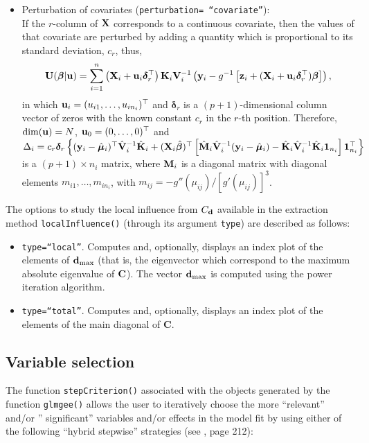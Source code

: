 \begin{itemize}
     \item Perturbation of covariates ({\tt perturbation= ``covariate''}):\\
     If the $r$-column of ${\bf X}$ corresponds to a continuous covariate, then the values of that covariate are perturbed by adding a quantity which is proportional to its standard deviation, $c_r$, thus, 
     \begin{equation*}
         {\bf U}(\bm{\beta}|{\bf u})=\sum\limits_{i=1}^{n} \left({\bf X}_i +{\bf u}_i {\bm{\delta}}_r^{\top}\right) {\bf K}_i {\bf V}_i^{-1} \left( {\bf y}_i - g^{-1} \left[{\bf z}_i + ({\bf X}_i + {\bf u}_i {\bm{\delta}}_r^{\top}) {\bm{\beta}}\right]\right),
     \end{equation*}
     in which ${\bf u}_i= (u_{i1},\ldots,u_{in_i})^{\top}$ and $\bm{\delta}_r$ is a $(p+1)$-dimensional column vector of zeros with the known constant $c_r$ in the $r$-th position. Therefore, ${\dim}({\bf u})=N$, ${\bf u}_0=(0,\ldots,0)^{\top}$ and $\Delta_i=c_r {\bm{\delta}}_r \left\{
     ({\bf y}_i - \hat{\bm{\mu}}_i)^{\top} \hat{\bf V}_i^{-1}\hat{\bf K}_i + ({\bf X}_i \hat{\bm{\beta}})^{\top} \left[ \hat{\bf M}_i\hat{\bf V}_i^{-1} ({\bf y}_i - \hat{\bm{\mu}}_i) - \hat{\bf K}_i \hat{\bf V}_i^{-1} \hat{\bf K}_i \bm{1}_{n_i}\right] {\bm 1}_{n_i}^{\top}\right\}$
     is a $(p+1)\times n_i$ matrix, where ${\bf M}_i$ is a diagonal matrix with diagonal elements $m_{i1},\ldots,m_{in_i}$, with $m_{ij}=-g''(\mu_{ij})/[g'(\mu_{ij})]^{3}$.
\end{itemize}
The options to study the local influence from $C_{\bf d}$ available in the extraction method {\tt localInfluence()} (through its argument {\tt type}) are described as follows:
\begin{itemize}
    \item {\tt type=``local''}. Computes and, optionally, displays an index plot of the elements of ${\bf d}_{\rm max}$ (that is, the eigenvector which correspond to the maximum absolute eigenvalue of ${\bf C}$). The vector ${\bf d}_{\rm max}$ is computed using the power iteration algorithm. 
    \item {\tt type=``total''}. Computes and, optionally, displays an index plot of the elements of the main diagonal of {\bf C}.
\end{itemize}

\subsection{Variable selection}
The function {\tt stepCriterion()} associated with the objects generated by the function {\tt glmgee()} allows the user to iteratively choose the more ``relevant'' and/or '' significant'' variables and/or effects in the model fit by using either of the following ``hybrid
stepwise'' strategies (see \cite{JWHT13}, page 212):


